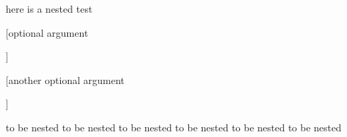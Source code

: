 here is a nested test
\begin{one}

	[optional argument

	]

	[another optional argument

	]

	to be nested to be nested
	to be nested to be nested
	to be nested to be nested
\end{one}
